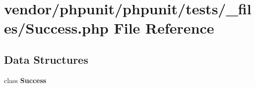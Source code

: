 \section{vendor/phpunit/phpunit/tests/\+\_\+files/\+Success.php File Reference}
\label{_success_8php}
\subsection*{Data Structures}
\begin{DoxyCompactItemize}
\item 
class {\bf Success}
\end{DoxyCompactItemize}

